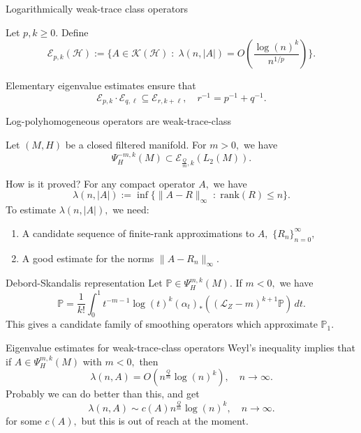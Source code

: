 \documentclass{beamer}
\numberwithin{equation}{section}
\theoremstyle{plain}
\theoremstyle{plain}
\theoremstyle{definition}
\theoremstyle{plain}
\theoremstyle{plain}
\theoremstyle{definition}
\newcommand{\Ec}{\mathcal{E}}
\newcommand{\Hc}{\mathcal{H}}
\newcommand{\Kc}{\mathcal{K}}
\newcommand{\Lc}{\mathcal{L}}
\newcommand{\Pb}{\mathbb{P}}
\newcommand{\Psib}{\mathbb{\Psi}}
\begin{document}
\begin{frame}{Logarithmically weak-trace class operators}
    \begin{definition}
        Let $p,k\geq 0.$ Define
        \[
            \Ec_{p,k}(\Hc) := \{A \in \Kc(\Hc)\;:\; \lambda(n,|A|) = O(\frac{\log(n)^k}{n^{1/p}})\}.
        \]
    \end{definition}
    Elementary eigenvalue estimates ensure that
    \[
        \Ec_{p,k}\cdot \Ec_{q,\ell} \subseteq \Ec_{r,k+\ell},\quad r^{-1}=p^{-1}+q^{-1}.
    \]
\end{frame}

\begin{frame}{Log-polyhomogeneous operators are weak-trace-class}
\begin{theorem}[M. (2026)]
    Let $(M,H)$ be a closed filtered manifold. For $m>0,$ we have
    \[
        \Psi^{-m,k}_H(M)\subset \Ec_{\frac{Q}{m},k}(L_2(M)).
    \]
\end{theorem}
\end{frame}

\begin{frame}{How is it proved?}
    For any compact operator $A,$ we have
    \[
        \lambda(n,|A|) := \inf\{\|A-R\|_{\infty}\;:\;\mathrm{rank}(R)\leq n\}.
    \]
    To estimate $\lambda(n,|A|),$ we need:
    \begin{enumerate}
        \item{} A candidate sequence of finite-rank approximations to $A,$ $\{R_n\}_{n=0}^\infty,$
        \item{} A good estimate for the norms $\|A-R_n\|_{\infty}.$
    \end{enumerate}
\end{frame}

\begin{frame}{Debord-Skandalis representation}
    Let $\Pb \in \Psib^{m,k}_H(M).$ If $m<0,$ we have
    \[
        \Pb = \frac{1}{k!}\int_0^{1} t^{-m-1}\log(t)^k(\alpha_t)_*((\Lc_Z-m)^{k+1}\Pb)\,dt.
    \]
    This gives a candidate family of smoothing operators which approximate $\Pb_1.$
\end{frame}

\begin{frame}{Eigenvalue estimates for weak-trace-class operators}
    Weyl's inequality implies that if $A \in \Psi^{m,k}_H(M)$ with $m<0,$ then
    \[
        \lambda(n,A) = O(n^{\frac{Q}{m}}\log(n)^k),\quad n\to\infty.
    \]
    Probably we can do better than this, and get
    \[
        \lambda(n,A) \sim c(A)n^{\frac{Q}{m}}\log(n)^k,\quad n\to\infty.
    \]
    for some $c(A),$ but this is out of reach at the moment.
\end{frame}
\end{document}
